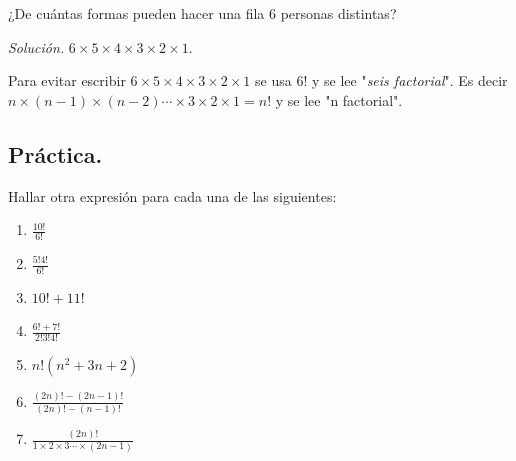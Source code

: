 \begin{ejemplo}
	¿De cuántas formas pueden hacer una fila 6 personas distintas?
\end{ejemplo}
\textit{Solución.} $6\times5\times4\times3\times2\times1$.
\vspace{0.2cm}

\begin{defi}
	Para evitar escribir $6\times5\times4\times3\times2\times1$ se usa $6!$ y se lee "\textit{seis factorial}". Es decir $n\times (n-1) \times (n-2) \cdots \times 3 \times 2\times 1 = n!$ y se lee "n factorial".
\end{defi}

\subsection*{\centering Práctica.}
Hallar otra expresión para cada una de las siguientes:
\begin{enumerate}[label=(\alph*)]
	\item $\frac{10!}{6!}$
	\item $\frac{5!4!}{6!}$
	\item $10!+11!$
	\item $\frac{6!+7!}{2!3!4!}$
	\item $n!(n^2 + 3n+2)$
	\item $\frac{(2n)!-(2n-1)!}{(2n)!-(n-1)!}$
	\item $\frac{(2n)!}{1\times 2\times 3\cdots \times (2n-1)}$
\end{enumerate}

